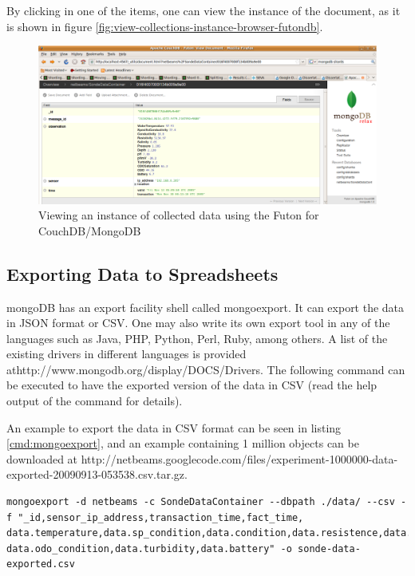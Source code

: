 By clicking in one of the items, one can view the instance of the document, as
it is shown in figure \ref{fig:view-collections-instance-browser-futondb}.

\begin{figure}[h]
  \centering
  \includegraphics[scale=0.5]{../diagrams/view-collected-data-instance-browser-futondb}
  \caption{Viewing an instance of collected data using the Futon for
  CouchDB/MongoDB}
  \label{fig:view-collected-data-instance-browser-futondb}
\end{figure}

\subsection{Exporting Data to Spreadsheets}

mongoDB has an export facility shell called mongoexport. It can export the data
in JSON format or CSV. One may also write its own export tool in any of the
languages such as Java, PHP, Python, Perl, Ruby, among others. A list of the
existing drivers in different languages is provided
athttp://www.mongodb.org/display/DOCS/Drivers. The following command can be
executed to have the exported version of the data in CSV (read the help output
of the command for details).

An example to export the data in CSV format can be seen in listing
\ref{cmd:mongoexport}, and an example containing 1 million objects can be
downloaded at
http://netbeams.googlecode.com/files/experiment-1000000-data-exported-20090913-053538.csv.tar.gz.

\lstset{label=cmd:mongoexport,caption=Command to export data in CSV format}
\begin{lstlisting}
mongoexport -d netbeams -c SondeDataContainer --dbpath ./data/ --csv -f "_id,sensor_ip_address,transaction_time,fact_time,
data.temperature,data.sp_condition,data.condition,data.resistence,data.salinitude,data.pressure,data.depth,data.ph,data.pH_mv,data.odo_sat,
data.odo_condition,data.turbidity,data.battery" -o sonde-data-exported.csv
\end{lstlisting}

